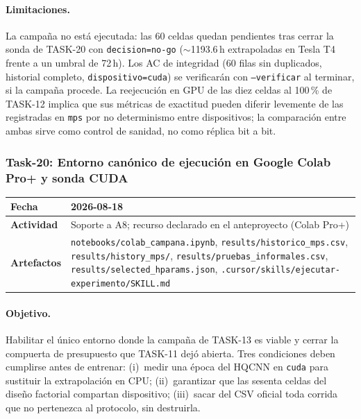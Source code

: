\paragraph{Limitaciones.}
La campaña no está ejecutada: las 60 celdas quedan pendientes tras cerrar la sonda de
TASK-20 con \texttt{decision=no-go} ($\sim$1193.6\,h extrapoladas en Tesla T4 frente a un
umbral de 72\,h). Los AC de integridad (60 filas sin duplicados, historial completo,
\texttt{dispositivo=cuda}) se verificarán con \texttt{--verificar} al terminar, si la campaña
procede. La reejecución en GPU de las diez celdas al 100\,\% de TASK-12 implica que sus
métricas de exactitud pueden diferir levemente de las registradas en \texttt{mps} por no
determinismo entre dispositivos; la comparación entre ambas sirve como control de sanidad, no
como réplica bit a bit.

\subsubsection{Task-20: Entorno canónico de ejecución en Google Colab Pro+ y sonda CUDA}
\label{hallazgo:task-20}
\begin{tabularx}{\textwidth}{|l|X|}\hline
\textbf{Fecha} & 2026-08-18 \\\hline
\textbf{Actividad} & Soporte a A8; recurso declarado en el anteproyecto (Colab Pro+) \\\hline
\textbf{Artefactos} & \texttt{notebooks/colab\_campana.ipynb}, \texttt{results/historico\_mps.csv}, \texttt{results/history\_mps/}, \texttt{results/pruebas\_informales.csv}, \texttt{results/selected\_hparams.json}, \texttt{.cursor/skills/ejecutar-experimento/SKILL.md} \\\hline
\end{tabularx}

\paragraph{Objetivo.}
Habilitar el único entorno donde la campaña de TASK-13 es viable y cerrar la compuerta de
presupuesto que TASK-11 dejó abierta. Tres condiciones deben cumplirse antes de entrenar:
(i)~medir una época del HQCNN en \texttt{cuda} para sustituir la extrapolación en CPU;
(ii)~garantizar que las sesenta celdas del diseño factorial compartan dispositivo;
(iii)~sacar del CSV oficial toda corrida que no pertenezca al protocolo, sin destruirla.

